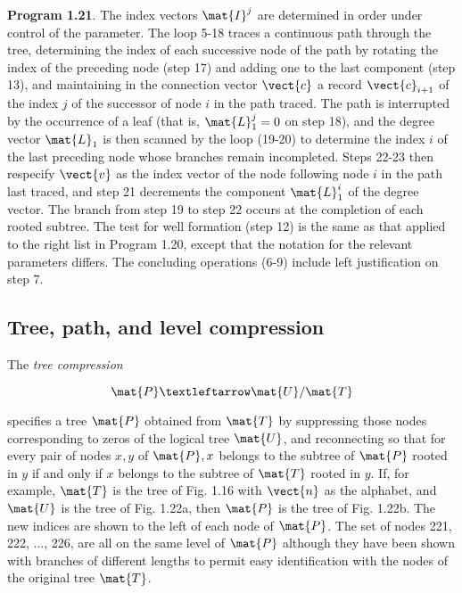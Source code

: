 \par \textbf{Program 1.21}. The index vectors $\mat{I}^j$ are determined in order under control of the parameter. The loop 5-18 traces a continuous path through the tree, determining the index of each successive node of the path by rotating the index of the preceding node (step 17) and adding one to the last component (step 13), and maintaining in the connection vector $\vect{c}$ a record $\vect{c}_{i+1}$ of the index $j$ of the successor of node $i$ in the path traced. The path is interrupted by the occurrence of a leaf (that is, $\mat{L}_1^j = 0$ on step 18), and the degree vector $\mat{L}_1$ is then scanned by the loop (19-20) to determine the index $i$ of the last preceding node whose branches remain incompleted. Steps 22-23 then respecify $\vect{v}$ as the index vector of the node following node $i$ in the path last traced, and step 21 decrements the component $\mat{L}_1^i$ of the degree vector. The branch from step 19 to step 22 occurs at the completion of each rooted subtree. The test for well formation (step 12) is the same as that applied to the right list in Program 1.20, except that the notation for the relevant parameters differs. The concluding operations (6-9) include left justification on step 7.


\subsection*{Tree, path, and level compression}

\par The \textit{tree compression}

$$
  \mat{P} ← \mat{U}/\mat{T}
$$

\noindent specifies a tree $\mat{P}$ obtained from $\mat{T}$ by suppressing those nodes corresponding to zeros of the logical tree $\mat{U}$, and reconnecting so that for every pair of nodes $x, y$ of $\mat{P}, x$ belongs to the subtree of $\mat{P}$ rooted in $y$ if and only if $x$ belongs to the subtree of $\mat{T}$ rooted in $y$. If, for example, $\mat{T}$ is the tree of Fig. 1.16 with $\vect{n}$ as the alphabet, and $\mat{U}$ is the tree of Fig. 1.22a, then $\mat{P}$ is the tree of Fig. 1.22b. The new indices are shown to the left of each node of $\mat{P}$. The set of nodes 221, 222, ..., 226, are all on the same level of $\mat{P}$ although they have been shown with branches of different lengths to permit easy identification with the nodes of the original tree $\mat{T}$.

